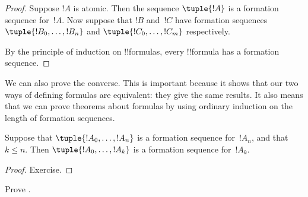 \documentclass[../../../include/open-logic-section]{subfiles}
\begin{document}
\begin{proof}
Suppose $!A$ is atomic. Then the sequence $\tuple{!A}$ is a
formation sequence for~$!A$.
%
Now suppose that $!B$ and~$!C$ have formation sequences
$\tuple{!B_0,\dotsc,!B_n}$ and $\tuple{!C_0,\dotsc,!C_m}$
respectively.
%
\begin{enumerate}
\end{enumerate}
By the principle of induction on !!{formula}s,
every !!{formula} has a formation sequence.
\end{proof}

We can also prove the converse. This is important because it shows
that our two ways of defining formulas are equivalent: they give
the same results. It also means that we can prove theorems about
formulas by using ordinary induction on the length of formation
sequences.

\begin{lem}
Suppose that $\tuple{!A_0,\dotsc,!A_n}$ is a formation sequence
for~$!A_n$, and that $k \leq n$. Then $\tuple{!A_0,\dotsc,!A_k}$
is a formation sequence for~$!A_k$.
\end{lem}

\begin{proof}
Exercise.
\end{proof}

\begin{prob}
Prove .
\end{prob}
\end{document}
